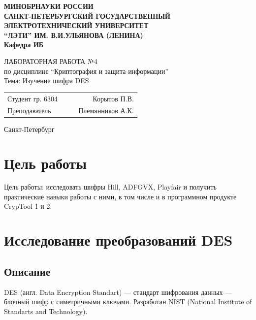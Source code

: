 \documentclass[a4paper, 14pt]{extarticle}
\begin{document}
\begin{titlepage}
    \centering
    {\bfseries
        \uppercase{
            Минобрнауки России \\
            Санкт-Петербургский государственный \\
            Электротехнический университет \\
            \enquote{ЛЭТИ} им. В.И.Ульянова (Ленина)\\
        }
        Кафедра ИБ

        \vspace{\fill}
        \uppercase{Лабораторная работа №4} \\
        по дисциплине \enquote{Криптография и защита информации} \\
        Тема: Изучение шифра DES
    }

    \vspace{\fill}
    \begin{tabularx}{0.8\textwidth}{l X c r}
        Студент гр. 6304 & & \underline{\hspace{3cm}} & Корытов П.В.\\
        Преподаватель & & \underline{\hspace{3cm}} & Племянников А.К.
    \end{tabularx}

    \vspace{1cm}
    Санкт-Петербург \\
    \the\year{}
\end{titlepage}

\newpage

\section*{Цель работы}
Цель работы: исследовать шифры Hill, ADFGVX, Playfair и получить практические навыки работы с ними, в том числе и в программном продукте CrypTool 1 и 2.

\section{Исследование преобразований DES}
\subsection{Описание}
DES (англ. Data Encryption Standart) --- стандарт шифрования данных --- блочный шифр с симетричными ключами. Разработан NIST (National Institute of Standarts and Technology).
\end{document}
